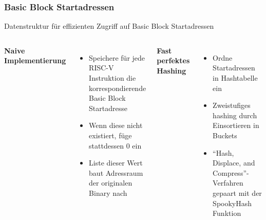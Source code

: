 \begin{frame}
    \frametitle{Basic Block Startadressen}{Datenstruktur für effizienten Zugriff auf Basic Block Startadressen}
    \vspace{1cm}
    \begin{columns}[t]
        \textbf{Naive Implementierung}
        \begin{itemize}
            \vspace{1em}
            \setlength{\itemsep}{1em}
            \item Speichere für jede RISC-V Instruktion die korrespondierende Basic Block Startadresse
            \item Wenn diese nicht existiert, füge stattdessen 0 ein
            \item Liste dieser Wert baut Adressraum der originalen Binary nach
        \end{itemize}
        \textbf{Fast perfektes Hashing}
        \begin{itemize}
            \vspace{1em}
            \setlength{\itemsep}{1em}
            \item Ordne Startadressen in Hashtabelle ein
            \item Zweistufiges hashing durch Einsortieren in Buckets
            \item ``Hash, Displace, and Compress''-Verfahren gepaart mit der SpookyHash Funktion
        \end{itemize}
    \end{columns}
\end{frame}
\clearpage

